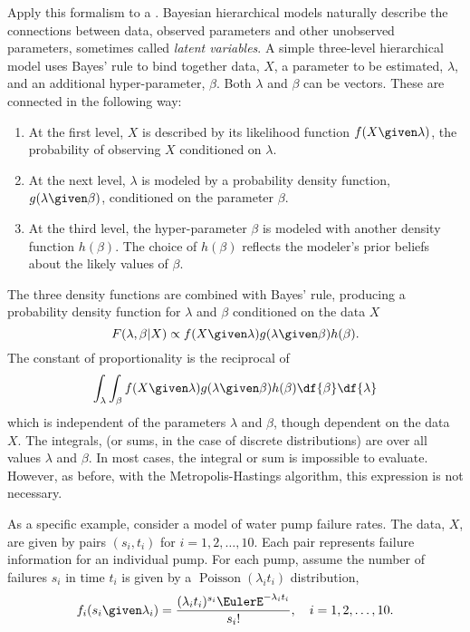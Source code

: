 \documentclass[12pt]{article}
\begin{document}
Apply this formalism to a .%
Bayesian hierarchical models naturally describe the connections between
data, observed parameters and other unobserved parameters, sometimes
called \emph{latent variables}.  A simple three-level hierarchical model
uses Bayes' rule to bind together data, \( X \), a parameter to be
estimated, \( \lambda \), and an additional hyper-parameter, \( \beta \).
Both \( \lambda \) and \( \beta \) can be vectors.  These are connected
in the following way:
\begin{enumerate}
    \item
        At the first level, \( X \) is described by its likelihood
        function \( f(X \given \lambda) \), the probability of observing
        \( X \) conditioned on \( \lambda \).
    \item
        At the next level, \( \lambda \) is modeled by a probability
        density function, \( g(\lambda \given \beta) \), conditioned on
        the parameter \( \beta \).
    \item
        At the third level, the hyper-parameter \( \beta \) is modeled
        with another density function \( h(\beta) \).  The choice of \(
        h(\beta) \) reflects the modeler's prior beliefs about the
        likely values of \( \beta \).
\end{enumerate}
The three density functions are combined with Bayes' rule, producing a
probability density function for \( \lambda \) and \( \beta \)
conditioned on the data \( X \)
\[
    F(\lambda, \beta | X) \propto f(X \given \lambda) g(\lambda \given
    \beta) h(\beta).
\] The constant of proportionality is the reciprocal of
\[
    \int_{\lambda} \int_{\beta} f(X \given \lambda) g(\lambda \given
    \beta) h(\beta) \df{\beta} \df{\lambda}
\] which is independent of the parameters \( \lambda \) and \( \beta \),
though dependent on the data \( X \).  The integrals, (or sums, in the
case of discrete distributions) are over all values \( \lambda \) and \(
\beta \).  In most cases, the integral or sum is impossible to evaluate.
However, as before, with the Metropolis-Hastings algorithm, this
expression is not necessary.

As a specific example, consider a model of water pump failure rates. The
data, \( X \), are given by pairs \( (s_i, t_i) \) for \( i = 1,2, \dots,
10 \).  Each pair represents failure information for an individual pump.
For each pump, assume the number of failures \( s_i \) in time \( t_i \)
is given by a \(
\operatorname{Poisson}
(\lambda_i t_i) \) distribution,
\[
    f_i(s_i \given \lambda_i) = \frac{(\lambda_i t_i)^{s_i} \EulerE^{-\lambda_i
    t_i}}{s_i!}, \quad i = 1,2, \dots, 10.
\]
\end{document}
